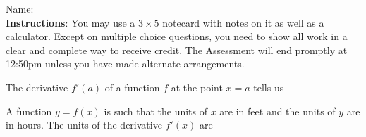 \documentclass[addpoints]{exam}
\begin{document}
		
\vspace*{0pt}

\noindent
Name: \underline{\hspace{2in}} \\


\noindent
\textbf{Instructions}:  You may use a $3 \times 5$ notecard with notes on it as well as a calculator. Except on multiple choice questions, you need to show all work in a clear and complete way to receive credit. The Assessment will end promptly at 12:50pm unless you have made alternate arrangements. 

\begin{questions}


\question[2] The derivative $f'(a)$ of a function $f$ at the point $x=a$ tells us

\question[2] A function $y = f(x)$ is such that the units of $x$ are in feet and the units of $y$ are in hours. The units of the derivative $f'(x)$ are 
\end{questions}
\end{document}
